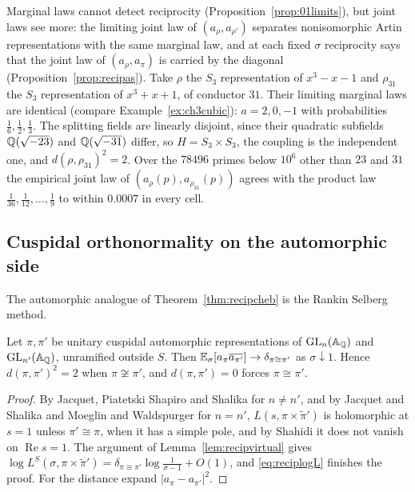 Marginal laws cannot detect reciprocity (Proposition~\ref{prop:01limits}), but joint laws see more: the limiting joint law of $(a_\rho,a_{\rho'})$ separates nonisomorphic Artin representations with the same marginal law, and at each fixed $\sigma$ reciprocity says that the joint law of $(a_\rho,a_\pi)$ is carried by the diagonal (Proposition~\ref{prop:recipas}). Take $\rho$ the $S_3$ representation of $x^3-x-1$ and $\rho_{31}$ the $S_3$ representation of $x^3+x+1$, of conductor $31$. Their limiting marginal laws are identical (compare Example~\ref{ex:ch3cubic}): $a=2,0,-1$ with probabilities $\frac16,\frac12,\frac13$. The splitting fields are linearly disjoint, since their quadratic subfields $\mathbb{Q}(\sqrt{-23})$ and $\mathbb{Q}(\sqrt{-31})$ differ, so $H=S_3\times S_3$, the coupling is the independent one, and $d(\rho,\rho_{31})^2=2$. Over the $78496$ primes below $10^6$ other than $23$ and $31$ the empirical joint law of $(a_\rho(p),a_{\rho_{31}}(p))$ agrees with the product law $\frac1{36},\frac1{12},\dots,\frac19$ to within $0.0007$ in every cell.

\subsection{Cuspidal orthonormality on the automorphic side}

The automorphic analogue of Theorem~\ref{thm:recipcheb} is the Rankin Selberg method.

\begin{theorem}\label{thm:recipcusp}
Let $\pi,\pi'$ be unitary cuspidal automorphic representations of $\mathrm{GL}_n(\mathbb{A}_{\mathbb{Q}})$ and $\mathrm{GL}_{n'}(\mathbb{A}_{\mathbb{Q}})$, unramified outside $S$. Then $\mathbb{E}_\sigma[a_\pi\overline{a_{\pi'}}]\to\delta_{\pi\cong\pi'}$ as $\sigma\downarrow1$. Hence $d(\pi,\pi')^2=2$ when $\pi\not\cong\pi'$, and $d(\pi,\pi')=0$ forces $\pi\cong\pi'$.
\end{theorem}

\begin{proof}
By Jacquet, Piatetski Shapiro and Shalika for $n\ne n'$, and by Jacquet and Shalika and Moeglin and Waldspurger for $n=n'$, $L(s,\pi\times\tilde\pi')$ is holomorphic at $s=1$ unless $\pi'\cong\pi$, when it has a simple pole, and by Shahidi it does not vanish on $\operatorname{Re}s=1$. The argument of Lemma~\ref{lem:recipvirtual} gives $\log L^S(\sigma,\pi\times\tilde\pi')=\delta_{\pi\cong\pi'}\log\frac1{\sigma-1}+O(1)$, and \eqref{eq:reciplogL} finishes the proof. For the distance expand $|a_\pi-a_{\pi'}|^2$.
\end{proof}

